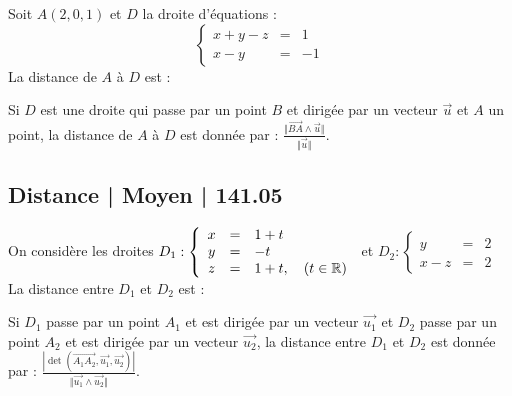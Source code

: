 \begin{question} 
Soit $A(2,0,1)$ et $D$ la droite d'équations :
$$\left\{\begin{array}{ccl}x+y-z&=&1\\x-y&=&-1 \end{array}\right.$$
  La distance de $A$ à $D$ est : 
\begin{answers}


 
   
    
     
   
\end{answers}
\begin{explanations}
Si $D$ est une droite qui passe par un point $B$ et dirigée par un vecteur $\vec{u}$  et $A$ un point, la distance de $A$ à $D$ est donnée par : $\frac{ \Vert \overrightarrow{BA} \wedge \vec{u} \Vert}{\Vert \vec{u}  \Vert}$.
\end{explanations}

\end{question}

\subsection{Distance | Moyen | 141.05}


\begin{question} 

On considère les droites $D_1 : \left\{\begin{array}{ccl}x&=&1+t\\y&=&-t\\ z&=&1+t,\quad (t \in \mathbb{R})  \end{array}\right.$ et 
$D_2 : \left\{\begin{array}{ccl}y&=&2\\x-z&=&2 \end{array}\right.$
La distance entre $D_1$ et $D_2$ est :
\begin{answers}


 
    
    
     
   
\end{answers}
\begin{explanations}
Si $D_1$ passe par un point $A_1$ et est dirigée par un vecteur $\vec{u_1}$ et 
 $D_2$ passe par un point $A_2$ et est dirigée par un vecteur $\vec{u_2}$, la distance entre $D_1$ et $D_2$ est donnée par : $\frac{|\det(\overrightarrow{A_1A_2},\vec{u_1}, \vec{u_2})|}{\Vert \vec{u_1} \wedge \vec{u_2} \Vert }$.
\end{explanations}

\end{question}


